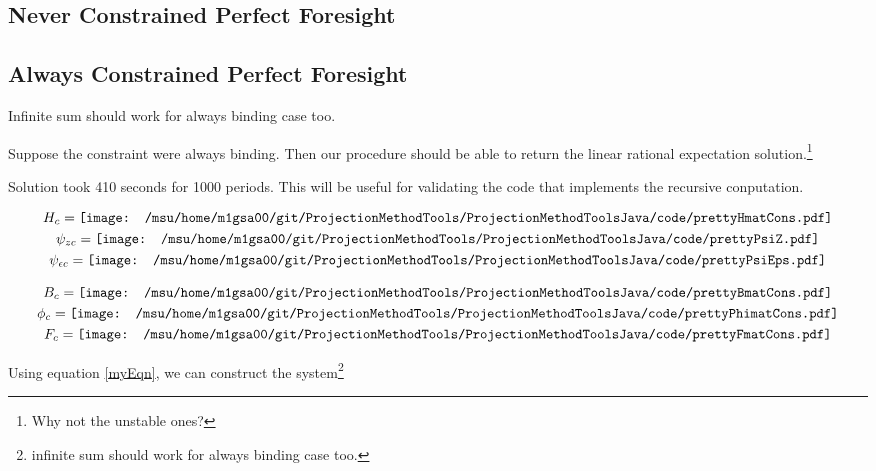 \documentclass[12pt]{article}
\begin{document}
\subsection{Never Constrained Perfect Foresight}
\label{sec:never-constr-perf}

\subsection{Always Constrained Perfect Foresight}
\label{sec:never-constr-perf}
Infinite sum should work for always binding case too.



Suppose the constraint were always binding.  
Then our procedure should be able to return the linear rational expectation
solution.\footnote{Why not the unstable ones?}

Solution took 410 seconds for 1000 periods.
This will be useful for validating the code that implements the recursive
conputation.


\begin{gather*}
  H_c= \vcenter{\hbox{\texttt{[image: /msu/home/m1gsa00/git/ProjectionMethodTools/ProjectionMethodToolsJava/code/prettyHmatCons.pdf]}}}\\
\psi_{zc}=   \vcenter{\hbox{\texttt{[image: /msu/home/m1gsa00/git/ProjectionMethodTools/ProjectionMethodToolsJava/code/prettyPsiZ.pdf]}}}\\
\psi_{\epsilon c}=   \vcenter{\hbox{\texttt{[image: /msu/home/m1gsa00/git/ProjectionMethodTools/ProjectionMethodToolsJava/code/prettyPsiEps.pdf]}}}\\
\end{gather*}




 \begin{gather*}
B_c=   \vcenter{\hbox{\texttt{[image: /msu/home/m1gsa00/git/ProjectionMethodTools/ProjectionMethodToolsJava/code/prettyBmatCons.pdf]}}}\\
\phi_c=   \vcenter{\hbox{\texttt{[image: /msu/home/m1gsa00/git/ProjectionMethodTools/ProjectionMethodToolsJava/code/prettyPhimatCons.pdf]}}}\\
F_c=   \vcenter{\hbox{\texttt{[image: /msu/home/m1gsa00/git/ProjectionMethodTools/ProjectionMethodToolsJava/code/prettyFmatCons.pdf]}}}
 \end{gather*}


Using equation \ref{myEqn}, we can construct the system\footnote{infinite sum should work for always binding case too.}
\end{document}
